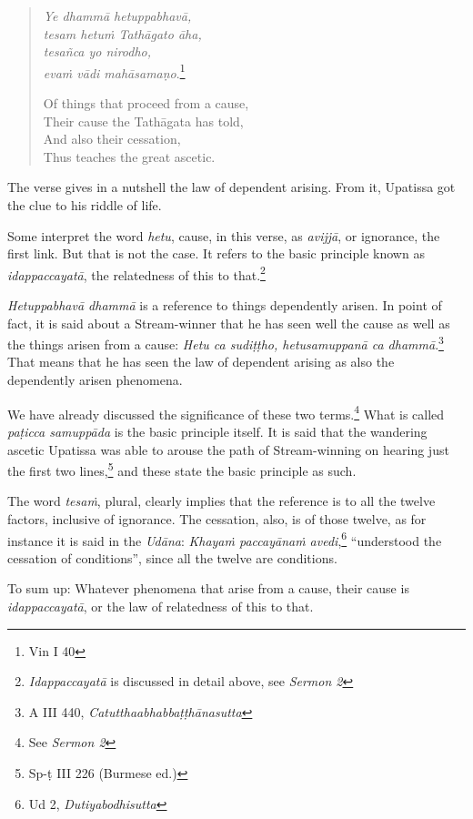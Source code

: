 \clearpage

\begin{quote}
\emph{Ye dhammā hetuppabhavā,}\\
\emph{tesam hetuṁ Tathāgato āha,}\\
\emph{tesañca yo nirodho,}\\
\emph{evaṁ vādi mahāsamaṇo}.\footnote{Vin I 40}

Of things that proceed from a cause,\\
Their cause the Tathāgata has told,\\
And also their cessation,\\
Thus teaches the great ascetic.
\end{quote}

The verse gives in a nutshell the law of dependent arising. From it, Upatissa got the clue to his riddle of life.

Some interpret the word \emph{hetu}, cause, in this verse, as \emph{avijjā}, or ignorance, the first link. But that is not the case. It refers to the basic principle known as \emph{idappaccayatā}, the relatedness of this to that.\footnote{\emph{Idappaccayatā} is discussed in detail above, see \emph{Sermon 2}}

\emph{Hetuppabhavā dhammā} is a reference to things dependently arisen. In point of fact, it is said about a Stream-winner that he has seen well the cause as well as the things arisen from a cause: \emph{Hetu ca sudiṭṭho, hetusamuppanā ca dhammā}.\footnote{A III 440, \emph{Catutthaabhabbaṭṭhānasutta}} That means that he has seen the law of dependent arising as also the dependently arisen phenomena.

We have already discussed the significance of these two terms.\footnote{See \emph{Sermon 2}} What is called \emph{paṭicca samuppāda} is the basic principle itself. It is said that the wandering ascetic Upatissa was able to arouse the path of Stream-winning on hearing just the first two lines,\footnote{Sp-ṭ III 226 (Burmese ed.)} and these state the basic principle as such.

The word \emph{tesaṁ}, plural, clearly implies that the reference is to all the twelve factors, inclusive of ignorance. The cessation, also, is of those twelve, as for instance it is said in the \emph{Udāna}: \emph{Khayaṁ paccayānaṁ avedi},\footnote{Ud 2, \emph{Dutiyabodhisutta}} ``understood the cessation of conditions'', since all the twelve are conditions.

To sum up: Whatever phenomena that arise from a cause, their cause is \emph{idappaccayatā}, or the law of relatedness of this to that.

